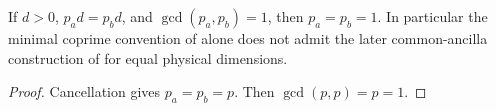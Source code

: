 \begin{lemma}
    \label{lem:mpu_balanced_coprime_ancilla}
    \leanok
    If $d>0$, $p_ad=p_bd$, and $\gcd(p_a,p_b)=1$, then $p_a=p_b=1$.
    In particular the minimal coprime convention of
    \cite[lines~706--724]{Cirac2017MPU} alone does not admit the later
    common-ancilla construction of
    \cite[lines~2210--2215]{Cirac2017MPU} for equal physical dimensions.
\end{lemma}

\begin{proof}\leanok
    Cancellation gives $p_a=p_b=p$. Then $\gcd(p,p)=p=1$.
\end{proof}


